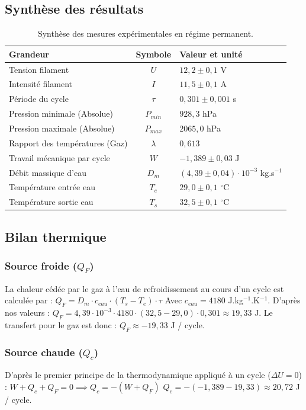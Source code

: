 \documentclass[a4paper,9pt,french]{scrartcl}
\begin{document}
\subsection{Synthèse des résultats}
\begin{table}[H]
\centering
\begin{tabular}{|l|c|l|}
\hline
{Grandeur} & {Symbole} & {Valeur et unité} \\ \hline
Tension filament & $U$ & $12,2 \pm 0,1$ V \\ \hline
Intensité filament & $I$ & $11,5 \pm 0,1$ A \\ \hline
Période du cycle & $\tau$ & $0,301 \pm 0,001$ s \\ \hline
Pression minimale (Absolue) & $P_{min}$ & $928,3$ hPa \\ \hline
Pression maximale (Absolue) & $P_{max}$ & $2065,0$ hPa \\ \hline
Rapport des températures (Gaz) & $\lambda$ & $0,613$ \\ \hline
Travail mécanique par cycle & $W$ & $-1,389 \pm 0,03$ J \\ \hline
Débit massique d'eau & $D_m$ & $(4,39 \pm 0,04) \cdot 10^{-3}$ kg.s$^{-1}$ \\ \hline
Température entrée eau & $T_e$ & $29,0 \pm 0,1$ $^{\circ}$C \\ \hline
Température sortie eau & $T_s$ & $32,5 \pm 0,1$ $^{\circ}$C \\ \hline
\end{tabular}
\caption{Synthèse des mesures expérimentales en régime permanent.}
\end{table}

\subsection{Bilan thermique}
\subsubsection{Source froide ($Q_F$)} 
La chaleur cédée par le gaz à l'eau de refroidissement au cours d'un cycle est calculée par :
$Q_F = D_m \cdot c_{eau} \cdot (T_s - T_e) \cdot \tau$
Avec $c_{eau} = 4180$ J.kg$^{-1}$.K$^{-1}$. 
D'après nos valeurs : 
$Q_F = 4,39 \cdot 10^{-3} \cdot 4180 \cdot (32,5 - 29,0) \cdot 0,301 \approx 19,33$ J.
Le transfert pour le gaz est donc : {$Q_F \approx -19,33$ J / cycle}.

\subsubsection{Source chaude ($Q_c$)} 
D'après le premier principe de la thermodynamique appliqué à un cycle ($\Delta U = 0$) :
$W + Q_c + Q_F = 0 \implies Q_c = - (W + Q_F)$
$Q_c = - (-1,389 - 19,33) \approx {20,72}$ {J / cycle}.
\end{document}
